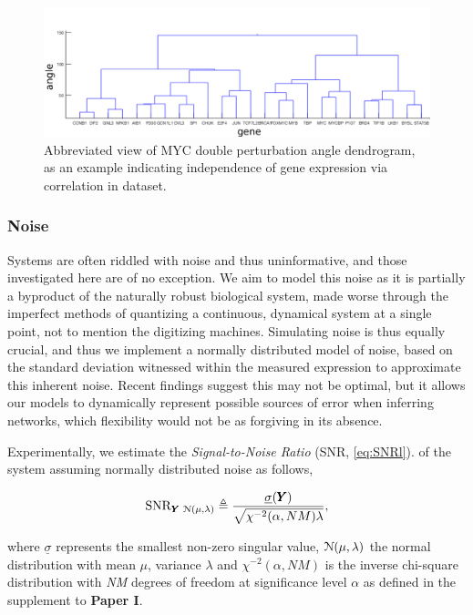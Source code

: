 \begin{figure}[H]
\centering
\includegraphics[width=1\linewidth]{4/MYC_Y_weightedDouble_dendrogram.png}
\caption{ Abbreviated view of MYC double perturbation angle dendrogram,  as an example indicating independence of gene expression via correlation in dataset.}
\label{fig:dend}
\end{figure}

\pagebreak

\subsubsection{Noise}
\label{sec:snr}
Systems are often riddled with noise and thus uninformative, and those investigated here are of no exception. We aim to model this noise as it is partially a byproduct of the naturally robust biological system, made worse through the imperfect methods of quantizing a continuous, dynamical system at a single point, not to mention the digitizing machines. Simulating noise is thus equally crucial, and thus we implement a normally distributed model of noise, based on the standard deviation witnessed within the measured expression to approximate this inherent noise. Recent findings suggest this may not be optimal, but it allows our models to dynamically represent possible sources of error when inferring networks, which flexibility would not be as forgiving in its absence.

Experimentally, we estimate the \emph{Signal-to-Noise Ratio} (SNR, \cref{eq:SNRl}). of the system assuming normally distributed noise as follows,

\begin{equation}
	\operatorname{SNR}_{{\pmb{Y}}\, \operatorname{\mathcal{N}(\mu,\lambda)}} \triangleq \frac{\underline{\sigma}({\pmb{Y}})}{\sqrt{\chi^{-2}(\alpha,NM)\lambda}},
  \label{eq:SNRl}
\end{equation}

where $\underline{\sigma}$ represents the smallest non-zero singular value, $\operatorname{\mathcal{N}(\mu,\lambda)}$ the normal distribution with mean $\mu$, variance $\lambda$ and $\chi^{-2}(\alpha,NM)$ is the inverse chi-square distribution with \emph{NM} degrees of freedom at significance level $\alpha$ as defined in the supplement to \textbf{Paper I}.

